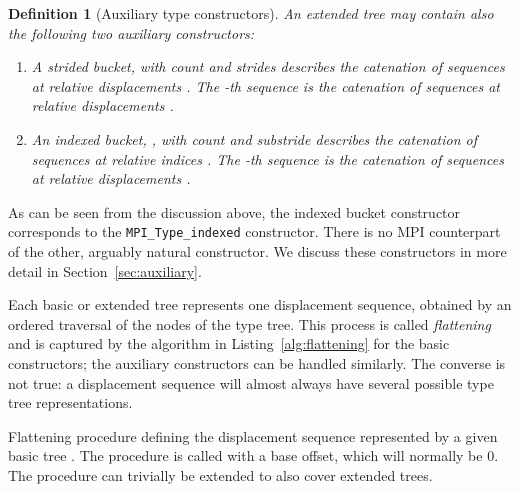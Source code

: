 \documentclass[a4paper,11pt]{article}
\newtheorem{definition}{Definition}
\begin{document}
\noindent
\begin{definition}[Auxiliary type constructors]
\label{def:auxconstructors}
An \emph{extended tree} may contain also the following two 
\emph{auxiliary constructors}:
\begin{enumerate}
\item
A \emph{strided bucket},  with \emph{count}  and
\emph{strides}  describes the catenation of  sequences at
relative displacements . The -th sequence is
the catenation of  sequences  at relative displacements
.
\item
An \emph{indexed bucket}, 
, with \emph{count} 
and \emph{substride}  describes the catenation of  sequences
at relative indices . The -th sequence
is the catenation of  sequences  at relative displacements
.
\end{enumerate}
\end{definition}

As can be seen from the discussion above, the indexed bucket
constructor corresponds to the \texttt{MPI\_\-Type\_\-indexed}
constructor. There is no MPI counterpart of the other, arguably
natural constructor. We discuss these constructors in more detail in
Section~\ref{sec:auxiliary}.

Each basic or extended tree represents one displacement sequence,
obtained by an ordered traversal of the nodes of the type tree. This
process is called \emph{flattening} and is captured by the algorithm
in Listing~\ref{alg:flattening} for the basic constructors; the
auxiliary constructors can be handled similarly. The converse is not
true: a displacement sequence will almost always have several possible
type tree representations.

\begin{algorithm}[t]
\caption{Flattening procedure defining the displacement sequence
  represented by a given basic tree . The procedure is called
  with a base offset, which will normally be 0. The procedure can
  trivially be extended to also cover extended trees.}
\label{alg:flattening}
\end{algorithm}
\end{document}
